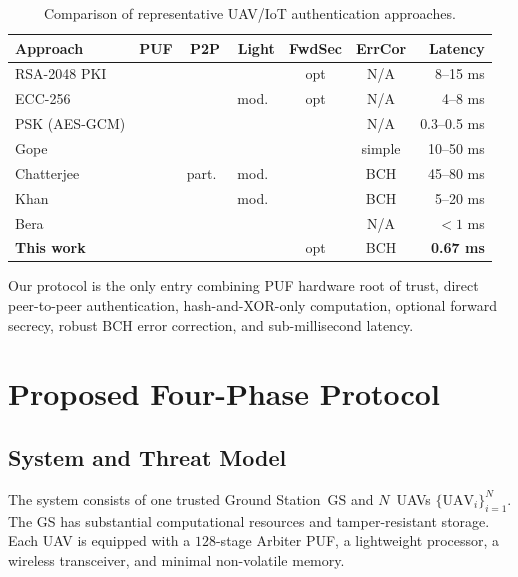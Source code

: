 \documentclass[journal,a4paper,10pt]{IEEEtran}
\newcommand{\xmark}{\ding{55}}
\newcommand{\cmark}{\checkmark}
\begin{document}
\begin{table}[t]
\centering
\caption{Comparison of representative UAV/IoT authentication approaches.}
\label{tab:related_comparison}
\scriptsize
\setlength{\tabcolsep}{3pt}
\begin{tabular}{@{}p{2.0cm}cccccr@{}}
\toprule
\textbf{Approach} & \textbf{PUF} & \textbf{P2P} & \textbf{Light} & \textbf{FwdSec} & \textbf{ErrCor} & \textbf{Latency} \\
\midrule
RSA-2048 PKI                          & \xmark & \cmark & \xmark   & opt    & N/A    & 8--15 ms  \\
ECC-256                               & \xmark & \cmark & mod.\    & opt    & N/A    & 4--8 ms   \\
PSK (AES-GCM)                         & \xmark & \cmark & \cmark   & \xmark & N/A    & 0.3--0.5 ms\\
Gope \cite{puf_lightweight_uav}       & \cmark & \xmark & \cmark   & \xmark & simple & 10--50 ms\\
Chatterjee \cite{puf_uav_cross_domain}& \cmark & part.\ & mod.\    & \xmark & BCH    & 45--80 ms \\
Khan \cite{puf_6g_uav}                & \cmark & \xmark & mod.\    & \cmark & BCH    & 5--20 ms  \\
Bera \cite{peer2peer_auth}            & \xmark & \cmark & \cmark   & \xmark & N/A    & $<1$ ms   \\
\textbf{This work}                    & \cmark & \cmark & \cmark   & opt    & BCH    & \textbf{0.67 ms}\\
\bottomrule
\end{tabular}
\normalsize
\end{table}

Our protocol is the only entry combining PUF hardware root of trust,
direct peer-to-peer authentication, hash-and-XOR-only computation,
optional forward secrecy, robust BCH error correction, and
sub-millisecond latency.


\section{Proposed Four-Phase Protocol}
\label{sec:protocol}

\subsection{System and Threat Model}
The system consists of one trusted Ground Station~$\mathrm{GS}$ and
$N$~UAVs $\{\mathrm{UAV}_i\}_{i=1}^{N}$. The GS has substantial
computational resources and tamper-resistant storage. Each UAV is
equipped with a $128$-stage Arbiter PUF, a lightweight processor, a
wireless transceiver, and minimal non-volatile memory.
\end{document}
